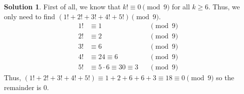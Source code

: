 \documentclass{article}
\theoremstyle{definition}
\newtheorem*{solution}{Solution}
\begin{document}
\begin{multicols}{2}
\begin{enumerate}
            \begin{solution}
                First of all, we know that $k! \equiv 0 \pmod{9}$ for all $k \geq 6$.
                Thus, we only need to find $(1! + 2! + 3! + 4! + 5!) \pmod{9}$.
				\begin{align*}
					1! &\equiv 1 &&\pmod{9} \\
					2! &\equiv 2 &&\pmod{9} \\
					3! &\equiv 6 &&\pmod{9} \\
					4! &\equiv 24 \equiv 6 &&\pmod{9} \\
					5! &\equiv 5 \cdot 6 \equiv 30 \equiv 3 &&\pmod{9}
				\end{align*}
                Thus, $(1! + 2! + 3! + 4! + 5!) \equiv 1 + 2 + 6 + 6 + 3 \equiv 18 \equiv 0 \pmod{9}$ so the remainder is 0.
            \end{solution}
    \end{enumerate}
\end{multicols}
\end{document}
